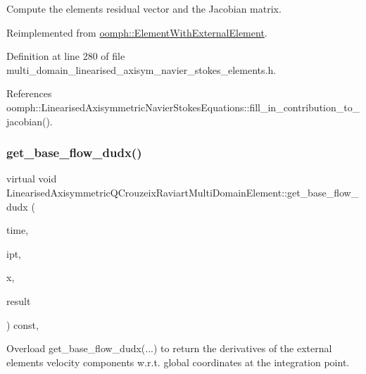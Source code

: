 Compute the element\textquotesingle{}s residual vector and the Jacobian matrix. 



Reimplemented from \hyperlink{classoomph_1_1ElementWithExternalElement_ae5fb09552a8271e891438f8d058ca1b8}{oomph\+::\+Element\+With\+External\+Element}.



Definition at line 280 of file multi\+\_\+domain\+\_\+linearised\+\_\+axisym\+\_\+navier\+\_\+stokes\+\_\+elements.\+h.



References oomph\+::\+Linearised\+Axisymmetric\+Navier\+Stokes\+Equations\+::fill\+\_\+in\+\_\+contribution\+\_\+to\+\_\+jacobian().

\mbox{\label{classLinearisedAxisymmetricQCrouzeixRaviartMultiDomainElement_a69af588f46bb76f29ace74218504fe8d}} 
\subsubsection{\texorpdfstring{get\+\_\+base\+\_\+flow\+\_\+dudx()}{get\_base\_flow\_dudx()}}
{\footnotesize\ttfamily virtual void Linearised\+Axisymmetric\+Q\+Crouzeix\+Raviart\+Multi\+Domain\+Element\+::get\+\_\+base\+\_\+flow\+\_\+dudx (\begin{DoxyParamCaption}\item[{const double \&}]{time,  }\item[{const unsigned \&}]{ipt,  }\item[{const \hyperlink{classoomph_1_1Vector}{Vector}$<$ double $>$ \&}]{x,  }\item[{\hyperlink{classoomph_1_1DenseMatrix}{Dense\+Matrix}$<$ double $>$ \&}]{result }\end{DoxyParamCaption}) const\hspace{0.3cm}{\ttfamily [inline]}, {\ttfamily [virtual]}}



Overload get\+\_\+base\+\_\+flow\+\_\+dudx(...) to return the derivatives of the external element\textquotesingle{}s velocity components w.\+r.\+t. global coordinates at the integration point. 



